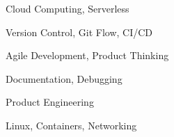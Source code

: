 \documentclass[11pt]{spidercv}
\begin{document}
    \begin{SideBar}{\ColorBackground}{\ColorTextSide}
        
        
        
        \vspace*{1cm}

        \begin{ItemList}{\ColorHighlight}
            \item [\faCode] Cloud Computing, Serverless
            \item [\faFileCodeO]  Version Control, Git Flow, CI/CD
            \item [\faCubes]  Agile Development, Product Thinking
            \item [\faPencilSquareO]  Documentation, Debugging
            \item [\faVideoCamera]  Product Engineering
            \item [\faGear]  Linux, Containers, Networking
        \end{ItemList}

        \vspace*{1cm}


        \begin{SpiderDiagram}{\ColorTextSide}{\ColorHighlight}
        \end{SpiderDiagram}

        \vspace*{1cm}


        \begin{SkillGauges}{\ColorHighlight}
        \end{SkillGauges}
    \end{SideBar}
\end{document}
